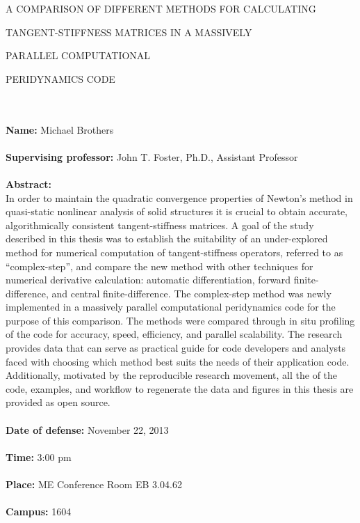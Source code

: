 \documentclass[12pt]{report}
\begin{document}
 
\centerline{A COMPARISON OF DIFFERENT METHODS FOR CALCULATING} 
\centerline{TANGENT-STIFFNESS MATRICES IN A MASSIVELY} 
\centerline{PARALLEL COMPUTATIONAL} 
\centerline{PERIDYNAMICS CODE} 
\noindent
\\ \\ \textbf{Name:} Michael Brothers \\ \\
%
\textbf{Supervising professor:} John T. Foster, Ph.D., Assistant Professor \\ \\
%
\textbf{Abstract:} \\ 
In order to maintain the quadratic convergence properties of Newton's method in
quasi-static nonlinear analysis of solid structures it is crucial to obtain
accurate, algorithmically consistent tangent-stiffness matrices. A goal of the
study described in this thesis was to establish the suitability of an
under-explored method for numerical computation of tangent-stiffness operators,
referred to as ``complex-step'', and compare the new method with other
techniques for numerical derivative calculation: automatic differentiation,
forward finite-difference, and central finite-difference. The complex-step
method was newly implemented in a massively parallel computational peridynamics
code for the purpose of this comparison. The methods were compared through in
situ profiling of the code for accuracy, speed, efficiency, and parallel
scalability. The research provides data that can serve as practical guide for
code developers and analysts faced with choosing which method best suits the
needs of their application code. Additionally, motivated by the reproducible
research movement, all the of the code, examples, and workflow to regenerate
the data and figures in this thesis are provided as open source. \\ \\
%
\textbf{Date of defense:}  November 22, 2013 \\ \\
% 
\textbf{Time:} 3:00 pm \\ \\
%
\textbf{Place:} ME Conference Room EB 3.04.62 \\ \\
%
\textbf{Campus:} 1604 \\ \\
\end{document}
